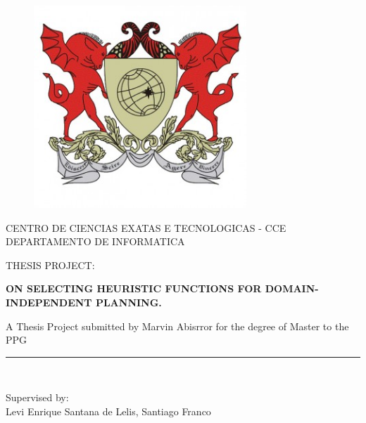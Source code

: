 \documentclass[11pt,a4paper,oneside]{report}
\begin{document}
\begin{titlepage}


\begin{center}
\vspace*{-1in}
\begin{figure}[htb]
\begin{center}
\includegraphics[width=8cm]{./image/ufv1}
\end{center}
\end{figure}

CENTRO DE CIENCIAS EXATAS E TECNOLOGICAS - CCE\\
\vspace*{0.15in}
DEPARTAMENTO DE INFORMATICA \\
\vspace*{0.6in}
\begin{large}
THESIS PROJECT:\\
\end{large}
\vspace*{0.2in}
\begin{Large}
\textbf{ON SELECTING HEURISTIC FUNCTIONS FOR DOMAIN-INDEPENDENT PLANNING.} \\
\end{Large}
\vspace*{0.3in}
\begin{large}
A Thesis Project submitted by Marvin Abisrror for the degree of Master to the PPG\\
\end{large}
\vspace*{0.3in}
\rule{80mm}{0.1mm}\\
\vspace*{0.1in}
\begin{large}
Supervised by: \\
Levi Enrique Santana de Lelis, Santiago Franco \\
\end{large}
\end{center}

\end{titlepage}
\end{document}
